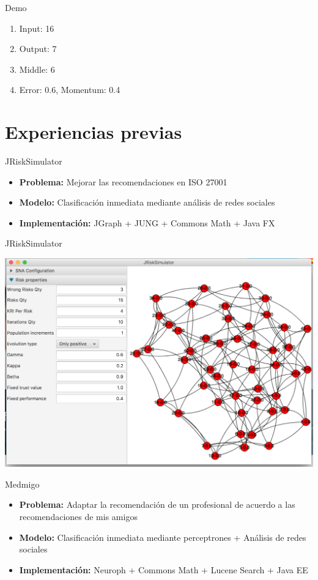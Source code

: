 \documentclass{beamer}
\begin{document}
\begin{frame}{Demo}
\begin{enumerate}
	\item Input: 16
	\item Output: 7
	\item Middle: 6
	\item Error: 0.6, Momentum: 0.4
\end{enumerate}
\end{frame}

\section{Experiencias previas}

\begin{frame}{JRiskSimulator}
    \begin{itemize}
        \item \textbf{Problema:} Mejorar las recomendaciones en ISO 27001
        \item \textbf{Modelo: } Clasificación inmediata mediante análisis de redes sociales
        \item \textbf{Implementación: }  JGraph + JUNG + Commons Math + Java FX
    \end{itemize}
\end{frame}

\begin{frame}{JRiskSimulator}
    \begin{center}
        \includegraphics[width=0.9\linewidth]{Images/jrisk}
    \end{center}
\end{frame}

\begin{frame}{Medmigo}
    \begin{itemize}
        \item \textbf{Problema:} Adaptar la recomendación de un profesional de acuerdo a las recomendaciones de mis amigos
        \item \textbf{Modelo: } Clasificación inmediata mediante perceptrones + Análisis de redes sociales
        \item \textbf{Implementación: } Neuroph + Commons Math + Lucene Search + Java EE 
    \end{itemize}
\end{frame}
\end{document}
